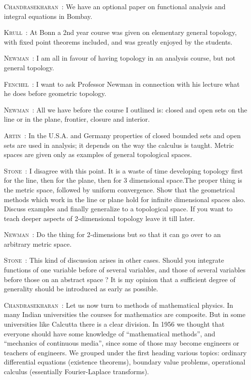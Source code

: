 \smallskip
\noindent
\textsc{Chandrasekharan}~: We have an optional paper on functional analysis and integral equations in Bombay.

\smallskip
\noindent
\textsc{Krull}~: At Bonn a 2nd year course was given on elementary general topology, with fixed point theorems included, and was greatly enjoyed by the students.

\smallskip
\noindent
\textsc{Newman}~: I am all in favour of having topology in an analysis course, but not general topology.

\smallskip
\noindent
\textsc{Fenchel}~: I want to ask Professor Newman in connection with his lecture what he does before geometric topology.

\smallskip
\noindent
\textsc{Newman}~: All we have before the course I outlined is: closed and open sets on the line or in the plane, frontier, closure and interior.

\smallskip
\noindent
\textsc{Artin}~: In the U.S.A. and Germany properties of closed bounded sets and open sets are used in analysis; it depends on the way the calculus is taught. Metric spaces are given only as examples of general topological spaces.

\smallskip
\noindent
\textsc{Stone}~: I disagree with this point. It is a waste of time developing topology first for the line, then for the plane, then for 3 dimensional space.\pageoriginale The proper thing is the metric space, followed by uniform convergence. Show that the geometrical methods which work in the line or plane hold for infinite dimensional spaces also. Discuss examples and finally generalize to a topological space. If you want to teach deeper aspects of 2-dimensional topology leave it till later.

\smallskip
\noindent
\textsc{Newman}~: Do the thing for 2-dimensions but so that it can go over to an arbitrary metric space.

\smallskip
\noindent
\textsc{Stone}~: This kind of discussion arises in other cases. Should you integrate functions of one variable before of several variables, and those of several variables before those on an abstract space ? It is my opinion that a sufficient degree of generality should be introduced as early as possible.

\smallskip
\noindent
\textsc{Chandrasekharan}~: Let us now turn to methods of mathematical physics. In many Indian universities the courses for mathematics are composite. But in some universities like Calcutta there is a clear division. In 1956 we thought that everyone should have some knowledge of ``mathematical methods'', and ``mechanics of continuous media'', since some of those may become engineers or teachers of engineers. We grouped under the first heading various topics: ordinary differential equations (existence theorems), boundary value problems, operational calculus (essentially Fourier-Laplace transforms).

